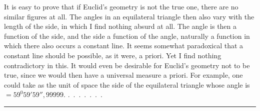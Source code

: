 It is easy to prove that if Euclid's geometry is not the true one,
there are no similar figures at all. The angles in an equilateral triangle
then also vary with the length of the side, in which I find nothing
absurd at all. The angle is then a function of the side, and the side a function
of the angle, naturally a function in which there also occurs a
constant line. It seems somewhat paradoxical that a constant line
  should be possible, as it were, a priori. Yet I find nothing
contradictory in this. It would even be desirable for Euclid's geometry not
  to be true, since we would then have a universal measure a priori. For example,
one could take as the unit of space the side of the equilateral triangle
  whose angle is $=59^{0} 59' 59''{,}99999$. .\ .\ .\ .\ .\ .\ .

\begin{center}\rule{3cm}{0.4pt}\end{center}
